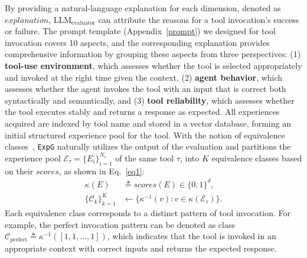 \documentclass[11pt]{article}
\newcommand{\ours}{\texttt{ExpG}}
\begin{document}
By providing a natural-language explanation for each dimension, denoted as $explanation$, $\mathrm{LLM}_{\mathrm{evaluator}}$ can attribute the reasons for a tool invocation's success or failure. The prompt template (Appendix~\ref{prompt}) we designed for tool invocation covers 10 aspects, and the corresponding explanation provides comprehensive information by grouping these aspects from three perspectives: (1) \textbf{tool-use environment}, which assesses whether the tool is selected appropriately and invoked at the right time given the context, (2) \textbf{agent behavior}, which assesses whether the agent invokes the tool with an input that is correct both syntactically and semantically, and (3) \textbf{tool reliability}, which assesses whether the tool executes stably and returns a response as expected. All experiences acquired are indexed by tool name and stored in a vector database, forming an initial structured experience pool for the tool. 
With the notion of equivalence classes~\cite{class}, {\ours} naturally utilizes the output of the evaluation and partitions the experience pool $\mathcal{E}_\tau=\{E_i\}_{i=1}^{N_\tau}$ of the same tool $\tau$, into $K$ equivalence classes based on their $scores$, as shown in Eq.~\ref{eq1}: 
\begin{equation}
\label{eq1}
\begin{aligned}
\kappa(E) &\triangleq scores(E)\in\{0,1\}^{d},\\
\{\mathcal{C}_k\}_{k=1}^{K} &\leftarrow \{\kappa^{-1}(v): v\in\kappa(\mathcal{E}_\tau)\}.
\end{aligned}
\end{equation}
Each equivalence class corresponds to a distinct pattern of tool invocation. For example, the perfect invocation pattern can be denoted as class $\mathcal{C}_{\mathrm{perfect}} \triangleq \kappa^{-1}\!\left([1,1,\ldots,1]\right)$, which indicates that the tool is invoked in an appropriate context with correct inputs and returns the expected response. 
\end{document}
